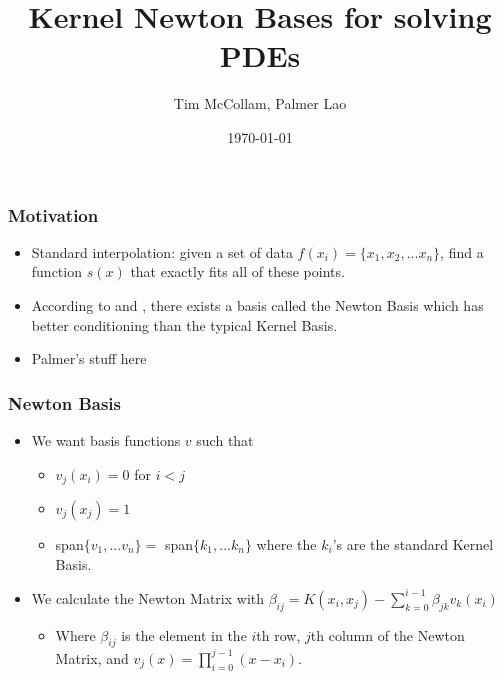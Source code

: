 \documentclass{beamer}
\title[Newton Bases and PDEs]{Kernel Newton Bases for solving PDEs} %
\author{Tim McCollam, Palmer Lao} %
\institute[IIT, CU] %
{
Illinois Institute of Technology, Clarkson University \\ %
\medskip
\textit{tmccolla@hawk.iit.edu, laopa@clarkson.edu} %
}
\date{\today} %
\begin{document}
\begin{frame}
\titlepage %
\end{frame}



\begin{frame}
\frametitle{Motivation}
\begin{itemize}
\item Standard interpolation: given a set of data $f(x_i)=\{x_1, x_2, ... x_n\}$, find a function $s(x)$ that exactly fits all of these points.
\item According to  and , there exists a basis called the Newton Basis which has better conditioning than the typical Kernel Basis.
\item Palmer's stuff here
\end{itemize}
\end{frame}


\begin{frame}
\frametitle{Newton Basis}
\begin{itemize}
\item We want basis functions $v$ such that
	\begin{itemize}
	\item $v_j(x_i)=0$ for $i<j$
	\item $v_j(x_j)=1$
	\item span$\{v_1, ... v_n\}=$ span$\{k_1, ... k_n\}$ where the $k_i$'s are the standard Kernel Basis.
	\end{itemize}
\item We calculate the Newton Matrix with $\beta_{ij}=K(x_i,x_j)-\sum\limits^{i-1}_{k=0}{\beta_{jk}v_{k}(x_i)}$
\begin{itemize}
\item Where $\beta_{ij}$ is the element in the $i$th row, $j$th column of the Newton Matrix,  and $v_j(x) = \prod_{i=0}^{j-1}(x-x_i)$.
\end{itemize}
\end{itemize}
\end{frame}
\end{document}
